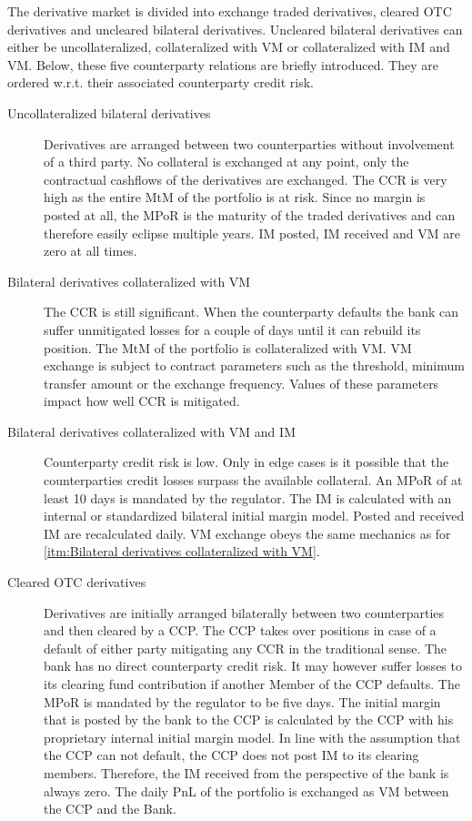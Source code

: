 \documentclass[../Thesis_AHoecherl.tex]{subfiles}
\begin{document}
The derivative market is divided into exchange traded derivatives, cleared OTC derivatives and uncleared bilateral derivatives. Uncleared bilateral derivatives can either be uncollateralized, collateralized with \gls{VM} or collateralized with \gls{IM} and \gls{VM}. Below, these five counterparty relations are briefly introduced. They are ordered w.r.t. their associated counterparty credit risk.

\begin{description}
    \item[Uncollateralized bilateral derivatives\label{itm:Uncollateralized bilateral derivatives}] Derivatives are arranged between two counterparties without involvement of a third party. No collateral is exchanged at any point, only the contractual cashflows of the derivatives are exchanged. The \gls{CCR} is very high as the entire \gls{MtM} of the portfolio is at risk. Since no margin is posted at all, the \gls{MPoR} is the maturity of the traded derivatives and can therefore easily eclipse multiple years. \gls{IM} posted, \gls{IM} received and \gls{VM} are zero at all times.
    \item[Bilateral derivatives collateralized with VM\label{itm:Bilateral derivatives collateralized with VM}] The \gls{CCR} is still significant. When the counterparty defaults the bank can suffer unmitigated losses for a couple of days until it can rebuild its position. The \gls{MtM} of the portfolio is collateralized with \gls{VM}. \gls{VM} exchange is subject to contract parameters such as the threshold, minimum transfer amount or the exchange frequency. Values of these parameters impact how well \gls{CCR} is mitigated.
    \item[Bilateral derivatives collateralized with \gls{VM} and \gls{IM}] Counterparty credit risk is low. Only in edge cases is it possible that the counterparties credit losses surpass the available collateral. An \gls{MPoR} of at least 10 days is mandated by the regulator. The IM is calculated with an internal or standardized bilateral initial margin model. Posted and received IM are recalculated daily. \gls{VM} exchange obeys the same mechanics as for \ref{itm:Bilateral derivatives collateralized with VM}.
    \item[Cleared OTC derivatives\label{itm:Cleared OTC derivatives}] Derivatives are initially arranged bilaterally between two counterparties and then cleared by a CCP. The CCP takes over positions in case of a default of either party mitigating any \gls{CCR} in the traditional sense. The bank has no direct counterparty credit risk. It may however suffer losses to its clearing fund contribution if another Member of the CCP defaults. The \gls{MPoR} is mandated by the regulator to be five days. The initial margin that is posted by the bank to the \gls{CCP} is calculated by the \gls{CCP} with his proprietary internal initial margin model. In line with the assumption that the CCP can not default, the CCP does not post IM to its clearing members. Therefore, the IM received from the perspective of the bank is always zero. The daily \gls{PnL} of the portfolio is exchanged as VM between the CCP and the Bank. 

\end{description}
\end{document}
